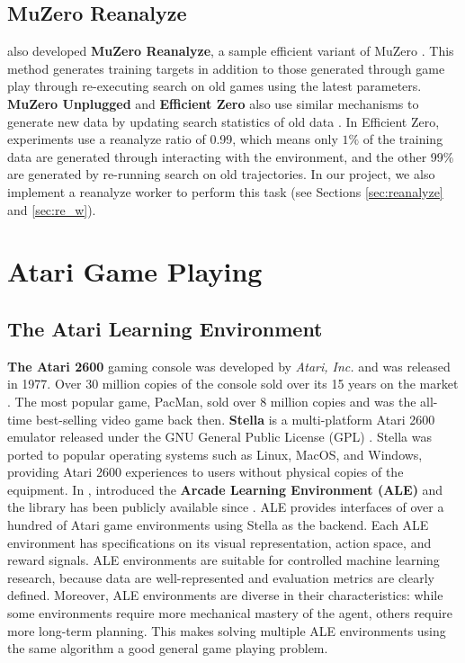 \subsection{MuZero Reanalyze} \label{sec:muzero_reanalyze}
\citeauthor{MasteringAtariGo_Schrittwieser.Antonoglou.ea_2020} also developed \textbf{MuZero Reanalyze}, a sample efficient variant of MuZero \cite{MasteringAtariGo_Schrittwieser.Antonoglou.ea_2020}.
This method generates training targets in addition to those generated through game play through re-executing search on old games using the latest parameters.
\textbf{MuZero Unplugged} and \textbf{Efficient Zero} also use similar mechanisms to generate new data by updating search statistics of old data \cite{OnlineOfflineReinforcement_Schrittwieser.Hubert.ea_2021}.
In Efficient Zero, experiments use a reanalyze ratio of 0.99, which means only $1\%$ of the training data are generated through interacting with the environment, and the other 99\% are generated by re-running search on old trajectories.
In our project, we also implement a reanalyze worker to perform this task (see Sections \ref{sec:reanalyze} and \ref{sec:re_w}).

\section{Atari Game Playing}
\subsection{The Atari Learning Environment} \label{sec:ale}
\textbf{The Atari 2600} gaming console was developed by \textit{Atari, Inc.} and was released in 1977.
Over 30 million copies of the console sold over its 15 years on the market \cite{Atari2600__2022}.
The most popular game, PacMan, sold over 8 million copies and was the all-time best-selling video game back then.
\textbf{Stella} is a multi-platform Atari 2600 emulator released under the GNU General Public License (GPL) \cite{StellaMultiPlatformAtari__}.
Stella was ported to popular operating systems such as Linux, MacOS, and Windows, providing Atari 2600 experiences to users without physical copies of the equipment.
In \citeyear{ArcadeLearningEnvironment_Bellemare.Naddaf.ea_2013}, \citeauthor{ArcadeLearningEnvironment_Bellemare.Naddaf.ea_2013} introduced the \textbf{Arcade Learning Environment (ALE)} and the library has been publicly available since \cite{ArcadeLearningEnvironment_Bellemare.Naddaf.ea_2013}.
ALE provides interfaces of over a hundred of Atari game environments using Stella as the backend.
Each ALE environment has specifications on its visual representation, action space, and reward signals.
ALE environments are suitable for controlled machine learning research,
because data are well-represented and evaluation metrics are clearly defined.
Moreover, ALE environments are diverse in their characteristics: while some environments require more mechanical mastery of the agent, others require more long-term planning.
This makes solving multiple ALE environments using the same algorithm a good general game playing problem.

